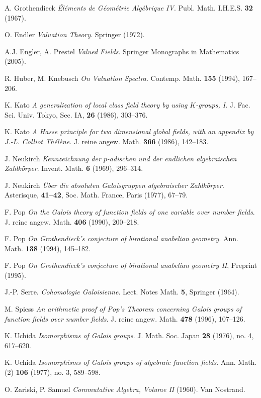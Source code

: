\begin{thebibliography}{999999}

    A. Grothendieck
    \textit{Éléments de Géométrie Algébrique IV}.
    Publ. Math. I.H.E.S. \textbf{32} (1967).
    
    O. Endler
    \textit{Valuation Theory}.
    Springer (1972).

    A.J. Engler, A. Prestel
    \textit{Valued Fields}.
    Springer Monographs in Mathematics (2005).
    
    R. Huber, M. Knebusch
    \textit{On Valuation Spectra}.
    Contemp. Math. \textbf{155} (1994), 167\---206.
    
    K. Kato
    \textit{A generalization of local class field theory by using $K$-groups, I}.
    J. Fac. Sci. Univ. Tokyo, Sec. IA, \textbf{26} (1986), 303\---376.

    K. Kato
    \textit{A Hasse principle for two dimensional global fields, with an appendix by J.-L. Colliot Thélène}.
    J. reine angew. Math. \textbf{366} (1986), 142\---183.
       
    J. Neukirch
    \textit{Kennzeichnung der $p$-adischen und der endlichen algebraischen Zahlkörper}.
    Invent. Math. \textbf{6} (1969), 296\---314.
    
    J. Neukirch
    \textit{Über die absoluten Galoisgruppen algebraischer Zahlkörper}. Asterisque, \textbf{41\---42}, Soc. Math. France, Paris (1977), 67\---79.
    
    F. Pop
    \textit{On the Galois theory of function fields of one variable over number fields}.
    J. reine angew. Math. \textbf{406} (1990), 200\---218.

    F. Pop
    \textit{On Grothendieck's conjecture of birational anabelian geometry}.
    Ann. Math. \textbf{138} (1994), 145\---182.

    F. Pop
    \textit{On Grothendieck's conjecture of birational anabelian geometry II}, Preprint (1995).
    
    J.-P. Serre.
    \textit{Cohomologie Galoisienne}.
    Lect. Notes Math. \textbf{5}, Springer (1964).
    
	M. Spiess
	\textit{An arithmetic proof of Pop's Theorem concerning Galois groups of function fields over number fields}.
    J. reine angew. Math. \textbf{478} (1996), 107\---126.
   
    K. Uchida
    \textit{Isomorphisms of Galois groups}.
    J. Math. Soc. Japan \textbf{28} (1976), no. 4, 617\---620.

    K. Uchida
    \textit{Isomorphisms of Galois groups of algebraic function fields}.
    Ann. Math. (2) \textbf{106} (1977), no. 3, 589\---598.
  
    O. Zariski, P. Samuel
    \textit{Commutative Algebra, Volume II} (1960). 
    Van Nostrand. 

\end{thebibliography}

